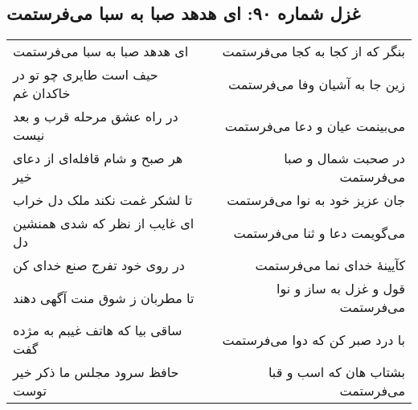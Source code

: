\begin{center}
\section*{غزل شماره ۹۰: ای هدهد صبا به سبا می‌فرستمت}
\label{sec:sh090}
\begin{longtable}{l p{0.5cm} r}
ای هدهد صبا به سبا می‌فرستمت
&&
بنگر که از کجا به کجا می‌فرستمت
\\
حیف است طایری چو تو در خاکدان غم
&&
زین جا به آشیان وفا می‌فرستمت
\\
در راه عشق مرحله قرب و بعد نیست
&&
می‌بینمت عیان و دعا می‌فرستمت
\\
هر صبح و شام قافله‌ای از دعای خیر
&&
در صحبت شمال و صبا می‌فرستمت
\\
تا لشکر غمت نکند ملک دل خراب
&&
جان عزیز خود به نوا می‌فرستمت
\\
ای غایب از نظر که شدی همنشین دل
&&
می‌گویمت دعا و ثنا می‌فرستمت
\\
در روی خود تفرج صنع خدای کن
&&
کآیینهٔ خدای نما می‌فرستمت
\\
تا مطربان ز شوق منت آگهی دهند
&&
قول و غزل به ساز و نوا می‌فرستمت
\\
ساقی بیا که هاتف غیبم به مژده گفت
&&
با درد صبر کن که دوا می‌فرستمت
\\
حافظ سرود مجلس ما ذکر خیر توست
&&
بشتاب هان که اسب و قبا می‌فرستمت
\\
\end{longtable}
\end{center}
